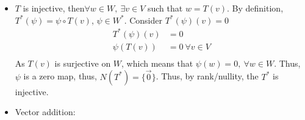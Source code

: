 \documentclass{article}
\begin{document}
\begin{itemize}
\begin{itemize}
\begin{align*}
\begin{pmatrix}
                0&0&0\\
                0&0&0\\
                0&0&1
            \end{pmatrix}
            \right\}
        \end{align*}
    \end{itemize}
    \item [3.] \(T\) is injective, then\(\forall w\in W,\ \exists v\in V\) such that \(w=T(v)\). By definition, 
    \(T^*(\psi) =\psi\circ T (v) \), \(\psi\in W^*\). Consider \(T^*(\psi)(v) = 0\)
    \begin{align*}
        T^*(\psi)(v) &= 0\\
        \psi(T(v))&=0 \ \forall v\in V\\
    \end{align*}
    As \(T(v)\) is surjective on \(W\), which means that \(\psi(w)=0,\ \forall w\in W\). Thus, \(\psi\) is a zero map, thus, \(N(T^*) = \{\overrightarrow{0}\}\). Thus, by rank/nullity, the \(T^*\) is injective.
    \item [4.] Vector addition:


\end{itemize}
\end{document}
